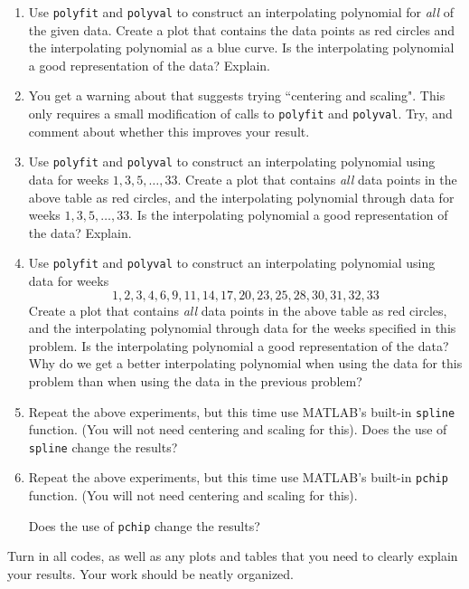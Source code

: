 \documentclass[12pt]{article}
\begin{document}
\begin{enumerate}
\begin{enumerate}
\item
Use {\tt polyfit} and {\tt polyval} to construct an interpolating polynomial
for {\em all} of the given data.  Create a plot that contains the data points
as red circles and the interpolating polynomial as a blue curve.   
Is the
interpolating polynomial a good representation of the data?  Explain.
\item
You get a warning about that suggests trying ``centering and scaling". This only requires a small 
modification of calls to {\tt polyfit} and {\tt polyval}. Try, and comment about whether this 
improves your result.
\item
Use {\tt polyfit} and {\tt polyval} to construct an interpolating polynomial
using data for weeks $1, 3, 5, \ldots, 33$.  Create a plot that contains 
{\em all} data points in the above table as red circles, and the interpolating polynomial 
through data for weeks $1, 3, 5, \ldots, 33$.  Is the interpolating polynomial
a good representation of the data?  Explain.
\item
Use {\tt polyfit} and {\tt polyval} to construct an interpolating polynomial
using data for weeks
$$
1, 2, 3, 4, 6, 9, 11, 14, 17, 20, 23, 25, 28, 30, 31, 32, 33
$$
Create a plot that contains 
{\em all} data points in the above table as red circles, and the interpolating polynomial 
through data for the weeks specified in this problem.  Is the interpolating polynomial
a good representation of the data?  Why do we get a better interpolating polynomial
when using the data for this problem than when using the data in the previous
problem? 
\item
Repeat the above experiments, but this time use MATLAB's built-in {\tt spline} function. (You will not need centering and scaling for this).
Does the use of {\tt spline} change the results?
\item
Repeat the above experiments, but this time use MATLAB's built-in {\tt pchip} function.   (You will not need centering and scaling for this).

Does the use of {\tt pchip} change the results? 
\end{enumerate}
\end{enumerate}

Turn in all codes, as well as any plots and tables
that you need to clearly explain your results.  Your work should
be neatly organized.
\end{document}

